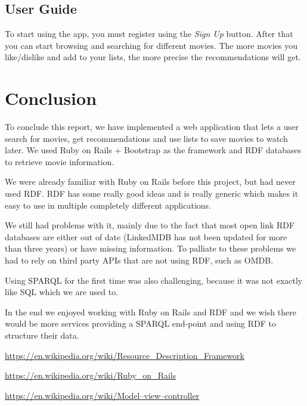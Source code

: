 \documentclass[12pt,a4paper]{article}
\begin{document}
\subsection{User Guide}
To start using the app, you must register using the \textit{Sign Up} button. After that you can start browsing and searching for different movies. The more movies you like/dislike and add to your lists, the more precise the recommendations will get.


\section{Conclusion}
To conclude this report, we have implemented a web application that lets a user search for movies, get recommendations and use lists to save movies to watch later. We used Ruby on Rails + Bootstrap as the framework and RDF databases to retrieve movie information.

We were already familiar with Ruby on Rails before this project, but had never used RDF. RDF has some really good ideas and is really generic which makes it easy to use in multiple completely different applications. 

We still had problems with it, mainly due to the fact that most open link RDF databases are either out of date (LinkedMDB has not been updated for more than three years) or have missing information. To palliate to these problems we had to rely on third party APIs that are not using RDF, such as OMDB.

Using SPARQL for the first time was also challenging, because it was not exactly like SQL which we are used to.

In the end we enjoyed working with Ruby on Rails and RDF and we wish there would be more services providing a SPARQL end-point and using RDF to structure their data.




\newpage
\begin{thebibliography}{20}

\href{https://en.wikipedia.org/wiki/Resource\_Description\_Framework}{https://en.wikipedia.org/wiki/Resource\_Description\_Framework}

\href{https://en.wikipedia.org/wiki/Ruby\_on\_Rails}{https://en.wikipedia.org/wiki/Ruby\_on\_Rails}

\href{https://en.wikipedia.org/wiki/Model\%E2\%80\%93view\%E2\%80\%93controller}{https://en.wikipedia.org/wiki/Model–view–controller}
\end{thebibliography}
\end{document}
